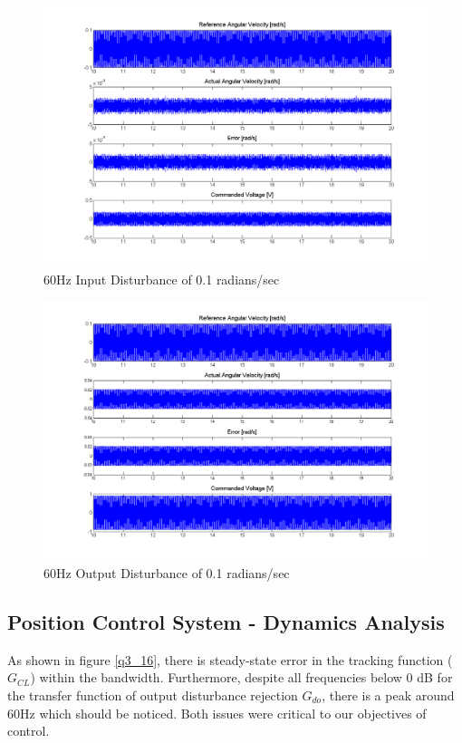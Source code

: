 \documentclass{article}
\theoremstyle{plain}
\theoremstyle{definition}
\theoremstyle{remark}
\begin{document}
\begin{figure}[htb]
\begin{center}
\includegraphics[width = 14 cm]{q3_14}
\caption{60Hz Input Disturbance of 0.1 radians/sec}
\label{q3_14}
\end{center}
\end{figure}

\begin{figure}[htb]
\begin{center}
\includegraphics[width = 14 cm]{q3_15}
\caption{60Hz Output Disturbance of 0.1 radians/sec}
\label{q3_15}
\end{center}
\end{figure}




\clearpage

\subsection*{Position Control System - Dynamics Analysis}
As shown in figure \ref{q3_16}, there is steady-state error in the tracking function ($G_{CL}$) within the bandwidth. Furthermore, despite all frequencies below 0 dB for the transfer function of output disturbance rejection $G_{do}$, there is a peak around 60Hz which should be noticed. Both issues were critical to our objectives of control.
\end{document}
